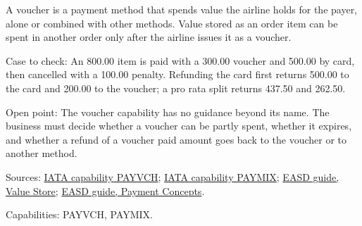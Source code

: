 \begin{definition}
  \label{def:payment-voucher-payment}
  \notready
  A voucher is a payment method that spends value the airline holds for the
  payer, alone or combined with other methods. Value stored as an order item
  can be spent in another order only after the airline issues it as a
  voucher.

  Case to check: An 800.00 item is paid with a 300.00 voucher and 500.00 by
  card, then cancelled with a 100.00 penalty. Refunding the card first
  returns 500.00 to the card and 200.00 to the voucher; a pro rata split
  returns 437.50 and 262.50.

  Open point: The voucher capability has no guidance beyond its name. The
  business must decide whether a voucher can be partly spent, whether it
  expires, and whether a refund of a voucher paid amount goes back to the
  voucher or to another method.

  Sources: \href{https://retailing.iata.org/armi/docs/PAYVCH/}{IATA capability PAYVCH};
  \href{https://retailing.iata.org/armi/docs/PAYMIX/}{IATA capability PAYMIX};
  \href{https://standards.atlassian.net/wiki/spaces/EASD/pages/574554245/Value+Store}{EASD guide, Value Store};
  \href{https://standards.atlassian.net/wiki/spaces/EASD/pages/574619671/Payment+Concepts}{EASD guide, Payment Concepts}.

  Capabilities: PAYVCH, PAYMIX.
\end{definition}
